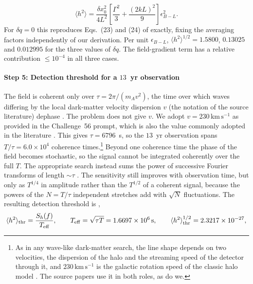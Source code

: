 %
\begin{equation}
\langle h^2\rangle=\frac{\delta x_0^2}{4L^2}\left[\frac{\Gamma^2}{3}+\frac{(2kL)^2}{9}\right]\epsilon_{B-L}^2 .
\label{eq:h2}
\end{equation}
%
For $\delta q=0$ this reproduces Eqs.~(23) and (24) of \citet{Morisaki2021} exactly, fixing the averaging factors independently of our derivation. Per unit $\epsilon_{B-L}$, $\langle h^2\rangle^{1/2}=1.5800$, $0.13025$ and $0.012995$ for the three values of $\delta q$. The field-gradient term has a relative contribution $\leq10^{-4}$ in all three cases.

\paragraph*{Step 5: Detection threshold for a $13$~yr observation}
The field is coherent only over $\tau=2\pi/(m_Av^2)$, the time over which waves differing by the local dark-matter velocity dispersion $v$ (the notation of the source literature) dephase \citep[Eq.~5]{Morisaki2021}. The problem does not give $v$. We adopt $v=230\,\mathrm{km\,s^{-1}}$ as provided in the Challenge~56 prompt, which is also the value commonly adopted in the literature \citep{Pierce2018,Morisaki2021,Michimura2020}. This gives $\tau=6796$~s, so the $13$~yr observation spans $T/\tau=6.0\times10^{4}$ coherence times.\footnote{As in any wave-like dark-matter search, the line shape depends on two velocities, the dispersion of the halo and the streaming speed of the detector through it, and $230\,\mathrm{km\,s^{-1}}$ is the galactic rotation speed of the classic halo model \citep{LewinSmith1996}. The source papers use it in both roles, as do we.} Beyond one coherence time the phase of the field becomes stochastic, so the signal cannot be integrated coherently over the full $T$. The appropriate search instead sums the power of successive Fourier transforms of length $\sim\tau$ \citep{Miller2021,LVK2022}. The sensitivity still improves with observation time, but only as $T^{1/4}$ in amplitude rather than the $T^{1/2}$ of a coherent signal, because the powers of the $N=T/\tau$ independent stretches add with $\sqrt N$ fluctuations. The resulting detection threshold is \citep[Eqs.~20 and 21]{Morisaki2021}, \citep[Eq.~9]{Pierce2018}
%
\begin{equation}
\langle h^2\rangle_{\rm thr}=\frac{S_h(f)}{T_{\rm eff}},\qquad T_{\rm eff}=\sqrt{\tau T}=1.6697\times10^{6}\,\mathrm{s},\qquad \langle h^2\rangle_{\rm thr}^{1/2}=2.3217\times10^{-27},
\label{eq:thr}
\end{equation}
